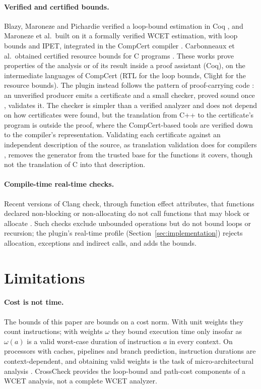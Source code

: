 \documentclass[oneside,english]{amsart}
\numberwithin{equation}{section}
\numberwithin{figure}{section}
\theoremstyle{plain}
\theoremstyle{definition}
\theoremstyle{plain}
\theoremstyle{remark}
\theoremstyle{plain}
\theoremstyle{definition}
\theoremstyle{plain}
\theoremstyle{remark}
\begin{document}
\paragraph{Verified and certified bounds.}
Blazy, Maroneze and Pichardie verified a loop-bound estimation in Coq \cite{blazy2013formal}, and Maroneze et al.\ built on it a formally verified WCET estimation, with loop bounds and IPET, integrated in the CompCert compiler \cite{maroneze2014formally}. Carbonneaux et al.\ obtained certified resource bounds for C programs \cite{carbonneaux2015compositional}. These works prove properties of the analysis or of its result inside a proof assistant (Coq), on the intermediate languages of CompCert (RTL for the loop bounds, Clight for the resource bounds). The plugin instead follows the pattern of proof-carrying code \cite{necula1997proof}: an unverified producer emits a certificate and a small checker, proved sound once \cite[Theorem~\ref{I-thm:checker-soundness}]{crosscheckTheory}, validates it. The checker is simpler than a verified analyzer and does not depend on how certificates were found, but the translation from C++ to the certificate's program is outside the proof, where the CompCert-based tools are verified down to the compiler's representation. Validating each certificate against an independent description of the source, as translation validation does for compilers \cite{pnueli1998translation,necula2000translation}, removes the generator from the trusted base for the functions it covers, though not the translation of C into that description.

\paragraph{Compile-time real-time checks.}
Recent versions of Clang check, through function effect attributes, that functions declared non-blocking or non-allocating do not call functions that may block or allocate \cite{clangeffects}. Such checks exclude unbounded operations but do not bound loops or recursion; the plugin's real-time profile (Section~\ref{sec:implementation}) rejects allocation, exceptions and indirect calls, and adds the bounds.

\section{Limitations}
\label{sec:limitations}

\paragraph{Cost is not time.}
The bounds of this paper are bounds on a cost norm. With unit weights they count instructions; with weights $\omega$ they bound execution time only insofar as $\omega(a)$ is a valid worst-case duration of instruction $a$ in every context. On processors with caches, pipelines and branch prediction, instruction durations are context-dependent, and obtaining valid weights is the task of micro-architectural analysis \cite{wilhelm2008worst}. CrossCheck provides the loop-bound and path-cost components of a WCET analysis, not a complete WCET analyzer.
\end{document}

